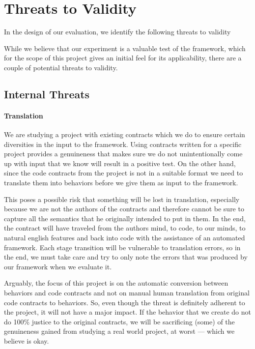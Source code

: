 \section{Threats to Validity}
In the design of our evaluation, we identify the following threats to validity

While we believe that our experiment  is a valuable test of the framework, which for the scope of this project gives an initial feel for its applicability, there are a couple of potential threats to validity.

\subsection{Internal Threats}
\paragraph{Translation}
We are studying a project with existing contracts which we do to ensure certain diversities in the input to the framework. Using contracts written for a specific project provides a genuineness that makes sure we do not unintentionally come up with input that we know will result in a positive test. On the other hand, since the code contracts from the project is not in a suitable format we need to translate them into behaviors before we give them as input to the framework.
 
This poses a possible risk that something will be lost in translation, especially because we are not the authors of the contracts and therefore cannot be sure to capture all the semantics that he originally intended to put in them. In the end, the contract will have traveled from the authors mind, to code, to our minds, to natural english features and back into code with the assistance of an automated framework. Each stage transition will be vulnerable to translation errors, so in the end, we must take care and try to only note the errors that was produced by our framework when we evaluate it.
 
Arguably, the focus of this project is on the automatic conversion between behaviors and code contracts and not on manual human translation from original code contracts to behaviors. So, even though the threat is definitely adherent to the project, it will not have a major impact. If the behavior that we create do not do 100\%  justice to the original contracts, we will be sacrificing (some) of the genuineness gained from studying a real world project, at worst --- which we believe is okay.

